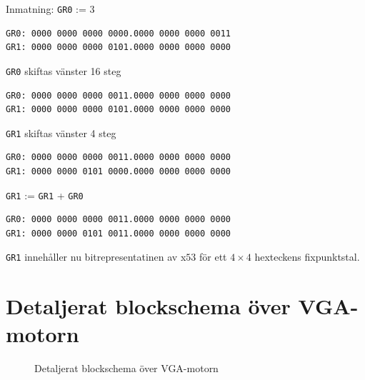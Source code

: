\documentclass[]{article}
\begin{document}
\begin{appendices}
\newpage

\noindent
Inmatning: \texttt{GR0} := 3
\begin{framed}
\begin{verbatim}
GR0: 0000 0000 0000 0000.0000 0000 0000 0011
GR1: 0000 0000 0000 0101.0000 0000 0000 0000
\end{verbatim}
\end{framed}

\noindent
\texttt{GR0} skiftas vänster 16 steg
\begin{framed}
\begin{verbatim}
GR0: 0000 0000 0000 0011.0000 0000 0000 0000
GR1: 0000 0000 0000 0101.0000 0000 0000 0000
\end{verbatim}
\end{framed}

\noindent
\texttt{GR1} skiftas vänster 4 steg
\begin{framed}
\begin{verbatim}
GR0: 0000 0000 0000 0011.0000 0000 0000 0000
GR1: 0000 0000 0101 0000.0000 0000 0000 0000
\end{verbatim}
\end{framed}

\noindent
\texttt{GR1} := \texttt{GR1} + \texttt{GR0}
\begin{framed}
\begin{verbatim}
GR0: 0000 0000 0000 0011.0000 0000 0000 0000
GR1: 0000 0000 0101 0011.0000 0000 0000 0000
\end{verbatim}
\end{framed}

\noindent
\texttt{GR1} innehåller nu bitrepresentatinen av x$53$ för ett $4 \times 4$ hexteckens fixpunktstal.

\newpage
\section{Detaljerat blockschema över VGA-motorn}
\label{figure:detailed_vga}
\begin{figure}[h!]
	\caption{Detaljerat blockschema över VGA-motorn}
\end{figure}
\end{appendices}
\end{document}
